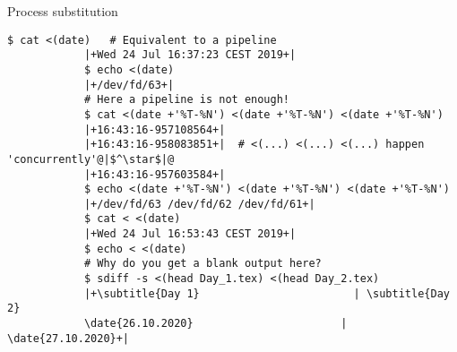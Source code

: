\begin{frame}[fragile]{Process substitution}
\begin{onlyenv}
\begin{lstlisting}[style=MyBash, xleftmargin=2mm, xrightmargin=0mm]
            $ cat <(date)   # Equivalent to a pipeline
            |+Wed 24 Jul 16:37:23 CEST 2019+|
            $ echo <(date)
            |+/dev/fd/63+|
            # Here a pipeline is not enough!
            $ cat <(date +'%T-%N') <(date +'%T-%N') <(date +'%T-%N')
            |+16:43:16-957108564+|
            |+16:43:16-958083851+|  # <(...) <(...) <(...) happen 'concurrently'@|$^\star$|@
            |+16:43:16-957603584+|
            $ echo <(date +'%T-%N') <(date +'%T-%N') <(date +'%T-%N')
            |+/dev/fd/63 /dev/fd/62 /dev/fd/61+|
            $ cat < <(date)
            |+Wed 24 Jul 16:53:43 CEST 2019+|
            $ echo < <(date)
            # Why do you get a blank output here?
            $ sdiff -s <(head Day_1.tex) <(head Day_2.tex)
            |+\subtitle{Day 1}                        | \subtitle{Day 2}
            \date{26.10.2020}                       | \date{27.10.2020}+|
        \end{lstlisting}
    \end{onlyenv}
\end{frame}
